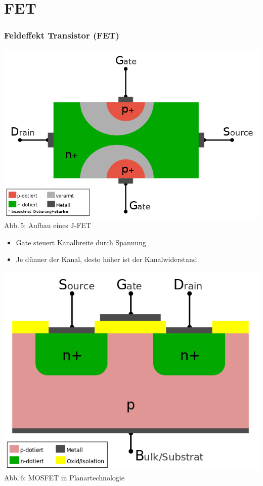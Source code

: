 \section*{FET}
\begin{frame}
  \frametitle{Feldeffekt Transistor (FET)}
  \begin{center}
    \includegraphics[width=\textwidth,height=.6\textheight,keepaspectratio]{a06/FET-aufbau.png}\\
    {\tiny Abb.\,5: Aufbau eines J-FET~\cite{wp}}
    \begin{itemize}
      \item Gate steuert Kanalbreite durch Spannung
      \item Je dünner der Kanal, desto höher ist der Kanalwiderstand
    \end{itemize}
  \end{center}
\end{frame}

\begin{frame}
  \begin{center}
    \includegraphics[width=\textwidth,height=.85\textheight,keepaspectratio]{a06/Isolierschicht-FET-intern.png}\\
    {\tiny Abb.\,6: MOSFET in Planartechnologie~\cite{wmde}}
  \end{center}
\end{frame}


